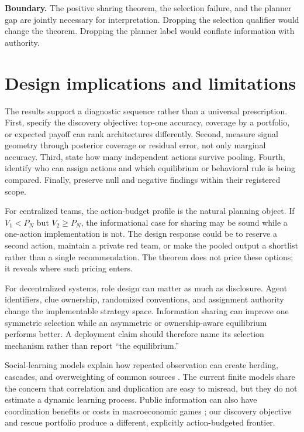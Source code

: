 \documentclass[12pt]{article}
\newcommand{\Boundary}[1]{\par\noindent\textbf{Boundary.} #1\par}
\theoremstyle{definition}
\begin{document}
\Boundary{The positive sharing theorem, the selection failure, and the planner
gap are jointly necessary for interpretation. Dropping the selection qualifier
would change the theorem. Dropping the planner label would conflate information
with authority.}

\section{Design implications and limitations}

The results support a diagnostic sequence rather than a universal prescription.
First, specify the discovery objective: top-one accuracy, coverage by a portfolio,
or expected payoff can rank architectures differently. Second, measure signal
geometry through posterior coverage or residual error, not only marginal
accuracy. Third, state how many independent actions survive pooling. Fourth,
identify who can assign actions and which equilibrium or behavioral rule is being
compared. Finally, preserve null and negative findings within their registered
scope.

For centralized teams, the action-budget profile is the natural planning object.
If $V_1<P_N$ but $V_2\geq P_N$, the informational case for sharing may be sound
while a one-action implementation is not. The design response could be to reserve
a second action, maintain a private red team, or make the pooled output a
shortlist rather than a single recommendation. The theorem does not price these
options; it reveals where such pricing enters.

For decentralized systems, role design can matter as much as disclosure. Agent
identifiers, clue ownership, randomized conventions, and assignment authority
change the implementable strategy space. Information sharing can improve one
symmetric selection while an asymmetric or ownership-aware equilibrium performs
better. A deployment claim should therefore name its selection mechanism rather
than report ``the equilibrium.''

Social-learning models explain how repeated observation can create herding,
cascades, and overweighting of common sources
\citep{Banerjee1992,BikhchandaniEtAl1992,DeMarzoEtAl2003}. The current finite
models share the concern that correlation and duplication are easy to misread,
but they do not estimate a dynamic learning process. Public information can also
have coordination benefits or costs in macroeconomic games
\citep{MorrisShin2002,CornandHeinemann2008}; our discovery objective and rescue
portfolio produce a different, explicitly action-budgeted frontier.
\end{document}
